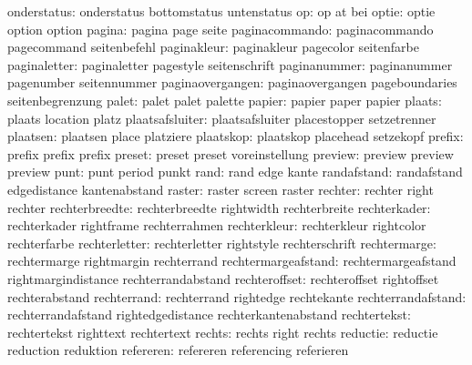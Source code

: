         onderstatus:  onderstatus          bottomstatus        untenstatus
                 op:  op                   at                  bei
              optie:  optie                option              option
             pagina:  pagina               page                seite
     paginacommando:  paginacommando       pagecommand         seitenbefehl
        paginakleur:  paginakleur          pagecolor           seitenfarbe
       paginaletter:  paginaletter         pagestyle           seitenschrift
       paginanummer:  paginanummer         pagenumber          seitennummer
   paginaovergangen:  paginaovergangen     pageboundaries      seitenbegrenzung
              palet:  palet                palet               palette
             papier:  papier               paper               papier
             plaats:  plaats               location            platz
    plaatsafsluiter:  plaatsafsluiter      placestopper        setzetrenner
           plaatsen:  plaatsen             place               platziere
          plaatskop:  plaatskop            placehead           setzekopf
             prefix:  prefix               prefix              prefix
             preset:  preset               preset              voreinstellung
            preview:  preview              preview             preview
               punt:  punt                 period              punkt
               rand:  rand                 edge                kante
        randafstand:  randafstand          edgedistance        kantenabstand
             raster:  raster               screen              raster
            rechter:  rechter              right               rechter
     rechterbreedte:  rechterbreedte       rightwidth          rechterbreite
       rechterkader:  rechterkader         rightframe          rechterrahmen
       rechterkleur:  rechterkleur         rightcolor          rechterfarbe
      rechterletter:  rechterletter        rightstyle          rechterschrift
       rechtermarge:  rechtermarge         rightmargin         rechterrand
rechtermargeafstand:  rechtermargeafstand  rightmargindistance rechterrandabstand
      rechteroffset:  rechteroffset        rightoffset         rechterabstand
        rechterrand:  rechterrand          rightedge           rechtekante
 rechterrandafstand:  rechterrandafstand   rightedgedistance   rechterkantenabstand
       rechtertekst:  rechtertekst         righttext           rechtertext
             rechts:  rechts               right               rechts
           reductie:  reductie             reduction           reduktion %
          refereren:  refereren            referencing         referieren
